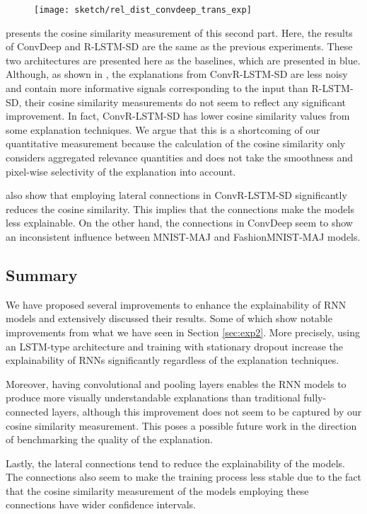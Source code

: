  \begin{figure}[!htb]
\centering
\texttt{[image: sketch/rel\_dist\_convdeep\_trans\_exp]}
\label{fig:rel_dist_convdeep_trans_exp}
\end{figure}

\addfigure{\ref{fig:rel_dist_convdeep_trans_exp}} presents the cosine similarity measurement of this second part. Here, the results of ConvDeep and R-LSTM-SD are the same as the previous experiments. These two architectures are presented here as the baselines, which are presented in blue.  Although,  as shown in \addfigure{\ref{fig:heatmap_msc_convrlstm_pos_rel}}, the explanations from ConvR-LSTM-SD are less noisy and contain more informative signals corresponding to the input than R-LSTM-SD, their cosine similarity measurements do not seem to reflect any significant improvement. In fact,  ConvR-LSTM-SD has lower cosine similarity values from some explanation techniques. We argue that this is a shortcoming of our quantitative measurement because the calculation of the cosine similarity only considers aggregated relevance quantities and does not take the smoothness and pixel-wise selectivity of the explanation into account. 

\addfigure{\ref{fig:rel_dist_convdeep_trans_exp}} also show that employing lateral connections in ConvR-LSTM-SD significantly reduces the cosine similarity. This implies that the connections make the models less explainable. On the other hand, the connections in ConvDeep  seem to show an inconsistent influence between MNIST-MAJ and FashionMNIST-MAJ models. 


\subsection{Summary}
We have proposed several improvements to enhance the explainability of RNN models and extensively discussed their results.  Some of which show notable improvements from what we have seen in Section \ref{sec:exp2}. More precisely, using an LSTM-type architecture and training with stationary dropout increase the explainability of RNNs significantly regardless of the explanation techniques.

Moreover, having convolutional and pooling layers enables the RNN models to produce more visually understandable explanations than traditional fully-connected layers, although this improvement does not seem to be  captured by our cosine similarity measurement. This poses a possible future work in the direction of benchmarking the quality of the explanation.

Lastly, the lateral connections tend to reduce the explainability of the models. The connections also seem to make the training process less stable due to the fact that the cosine similarity measurement of the models employing these connections have wider confidence intervals.